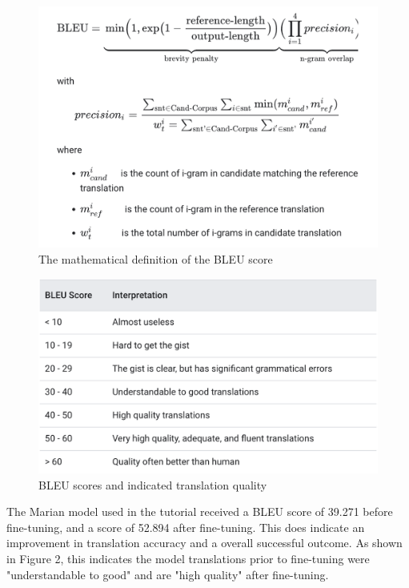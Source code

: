 \documentclass[10pt,twocolumn]{article}
\begin{document}
\begin{figure}
    \centering
    \includegraphics[width=.95\linewidth]{BLEUMathematicalDefinition.PNG}
    \caption{
        The mathematical definition of the BLEU score
    }
    \label{fig:first-page}
\end{figure}

\begin{figure}
    \centering
    \includegraphics[width=.95\linewidth]{BLEUInterpretation.PNG}
    \caption{
        BLEU scores and indicated translation quality
    }
    \label{fig:first-page}
\end{figure}


The Marian model used in the tutorial received a BLEU score of 39.271 before fine-tuning, and a score of 52.894 after fine-tuning. This does indicate an improvement in translation accuracy and a overall successful outcome. As shown in Figure 2, this indicates the model translations prior to fine-tuning were "understandable to good" and are "high quality" after fine-tuning. 
\end{document}
